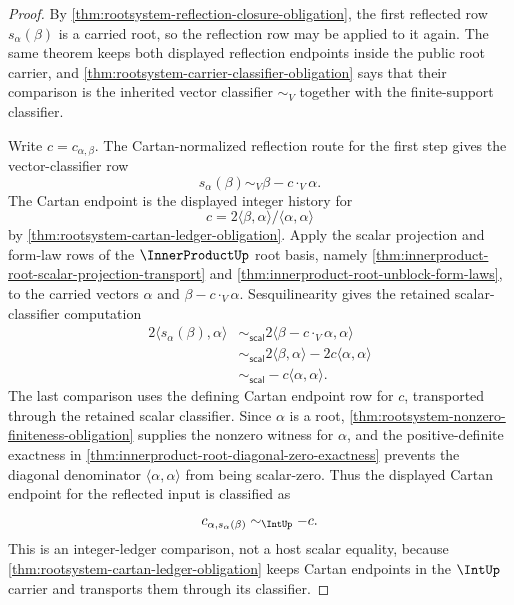 \begin{proof}
By \autoref{thm:rootsystem-reflection-closure-obligation}, the first reflected row
$s_\alpha(\beta)$ is a carried root, so the reflection row may be applied to it again. The same theorem keeps both displayed reflection endpoints inside the public root carrier, and \autoref{thm:rootsystem-carrier-classifier-obligation} says that their comparison is the inherited vector classifier $\sim_V$ together with the finite-support classifier.

Write $c=c_{\alpha,\beta}$. The Cartan-normalized reflection route for the first step gives the vector-classifier row
$$
s_\alpha(\beta)
\sim_V
\beta-c\cdot_V\alpha.
$$
The Cartan endpoint is the displayed integer history for
$$
c=2\langle\beta,\alpha\rangle/\langle\alpha,\alpha\rangle
$$
by \autoref{thm:rootsystem-cartan-ledger-obligation}. Apply the scalar projection and form-law rows of the $\InnerProductUp$ root basis, namely \autoref{thm:innerproduct-root-scalar-projection-transport} and \autoref{thm:innerproduct-root-unblock-form-laws}, to the carried vectors $\alpha$ and $\beta-c\cdot_V\alpha$. Sesquilinearity gives the retained scalar-classifier computation
$$
\begin{aligned}
2\langle s_\alpha(\beta),\alpha\rangle
&\sim_{\mathsf{scal}}
2\langle\beta-c\cdot_V\alpha,\alpha\rangle \\
&\sim_{\mathsf{scal}}
2\langle\beta,\alpha\rangle-2c\langle\alpha,\alpha\rangle \\
&\sim_{\mathsf{scal}}
-c\langle\alpha,\alpha\rangle.
\end{aligned}
$$
The last comparison uses the defining Cartan endpoint row for $c$, transported through the retained scalar classifier. Since $\alpha$ is a root, \autoref{thm:rootsystem-nonzero-finiteness-obligation} supplies the nonzero witness for $\alpha$, and the positive-definite exactness in \autoref{thm:innerproduct-root-diagonal-zero-exactness} prevents the diagonal denominator $\langle\alpha,\alpha\rangle$ from being scalar-zero. Thus the displayed Cartan endpoint for the reflected input is classified as
$$
c_{\alpha,s_\alpha(\beta)}\sim_{\IntUp}-c.
$$
This is an integer-ledger comparison, not a host scalar equality, because \autoref{thm:rootsystem-cartan-ledger-obligation} keeps Cartan endpoints in the $\IntUp$ carrier and transports them through its classifier.


\end{proof}
